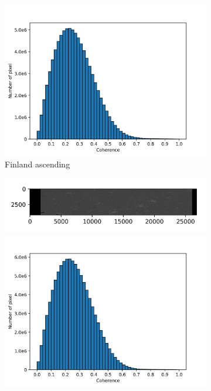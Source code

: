\documentclass[preprint, authoryear]{elsarticle}
\begin{document}
\begin{figure}
\begin{subfigure}{0.5\textwidth}
\begin{minipage}{0.5\textwidth}
            \includegraphics[width=\textwidth]{figure/The coherence/coh_Finland_asc_esd1_histogram_.png}
        \end{minipage}
        \caption{Finland ascending}
        \label{fig_6h}
    \end{subfigure}%
    \begin{subfigure}{0.5\textwidth}
        \centering
        \begin{minipage}{0.5\textwidth}
            \centering
            \includegraphics[width=\textwidth]{figure/The coherence/coh_Finland_des_esd1.png}
        \end{minipage}%
        \begin{minipage}{0.5\textwidth}
            \centering
            \includegraphics[width=\textwidth]{figure/The coherence/coh_Finland_des_esd1_histogram_.png}

\end{minipage}
\end{subfigure}
\end{figure}
\end{document}
